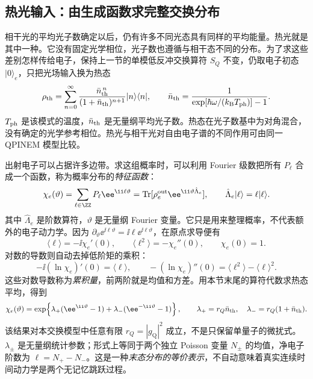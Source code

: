 \subsection{热光输入：由生成函数求完整交换分布}
\label{sec:electron-thermal-exchange-analytic}

相干光的平均光子数确定以后，仍有许多不同光态具有同样的平均能量。热光就是其中一种。它没有固定光学相位，光子数也遵循与相干态不同的分布。为了求这些差别怎样传给电子，保持上一节的单模低反冲交换算符 $S_Q$ 不变，仍取电子初态 $|0\rangle_e$，只把光场输入换为热态
\begin{equation*}
 \rho_{\rm th}=\sum_{n=0}^\infty
 \frac{\bar n_{\rm th}^{\,n}}{(1+\bar n_{\rm th})^{n+1}}|n\rangle\langle n|,
 \qquad \bar n_{\rm th}=\frac1{\exp[\hbar\omega/(k_{\rm B}T_{\rm ph})]-1}.
\end{equation*}
$T_{\rm ph}$ 是该模式的温度，$\bar n_{\rm th}$ 是无量纲平均光子数。热态在光子数基中为对角混合，没有确定的光学参考相位。热光与相干光对自由电子谱的不同作用可由同一 QPINEM 模型比较\cite{Dahan2021Science}。

出射电子可以占据许多边带。求这组概率时，可以利用 Fourier 级数把所有 $P_\ell$ 合成一个函数，称为概率分布的\emph{特征函数}：
\begin{equation*}
 \chi_e(\vartheta)=\sum_{\ell\in\ZZ}P_\ell\ee^{\ii\ell\vartheta}
 =\operatorname{Tr}[\rho_e^{\rm out}\ee^{\ii\vartheta\hat\Lambda_e}],
 \qquad \hat\Lambda_e|\ell\rangle=\ell|\ell\rangle.
\end{equation*}
其中 $\hat\Lambda_e$ 是阶数算符，$\vartheta$ 是无量纲 Fourier 变量。它只是用来整理概率，不代表额外的电子动力学。因为 $\partial_\vartheta\ee^{\ii\ell\vartheta}=\ii\ell\ee^{\ii\ell\vartheta}$，在原点求导便有
\[
\langle\ell\rangle=-\ii\chi_e'(0),\qquad
\langle\ell^2\rangle=-\chi_e''(0),\qquad \chi_e(0)=1.
\]
对数的导数则自动去掉低阶矩的乘积：
\[
-\ii(\ln\chi_e)'(0)=\langle\ell\rangle,\qquad
-(\ln\chi_e)''(0)=\langle\ell^2\rangle-\langle\ell\rangle^2.
\]
这些对数导数称为\emph{累积量}，前两阶就是均值和方差。用本节末尾的算符代数求热态平均，得到
\begin{equation}
 \chi_e(\vartheta)=
 \exp\!\left\{\lambda_+(\ee^{\ii\vartheta}-1)
             +\lambda_-(\ee^{-\ii\vartheta}-1)\right\},
 \qquad
 \lambda_+=r_Q\bar n_{\rm th},\quad
 \lambda_-=r_Q(1+\bar n_{\rm th}).
 \label{eq:electron-thermal-characteristic}
\end{equation}
该结果对本交换模型中任意有限 $r_Q=|g_{\mathrm Q}|^2$ 成立，不是只保留单量子的微扰式。$\lambda_\pm$ 是无量纲统计参数；形式上等同于两个独立 Poisson 变量 $N_\pm$ 的均值，净电子阶数为 $\ell=N_+-N_-$。这是一种\emph{末态分布的等价表示}，不自动意味着真实连续时间动力学是两个无记忆跳跃过程。

